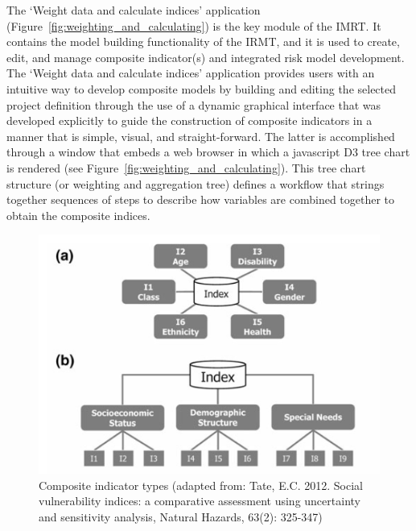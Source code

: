 The `Weight data and calculate indices' application
(Figure~\ref{fig:weighting_and_calculating}) is the key module of the IMRT\@. It
contains the model building functionality of the IRMT, and it is used to
create, edit, and manage composite indicator(s) and integrated risk model
development. The `Weight data and calculate indices' application provides users
with an intuitive way to develop composite models by building and editing the
selected project definition through the use of a dynamic graphical interface
that was developed explicitly to guide the construction of composite indicators
in a manner that is simple, visual, and straight-forward. The latter is
accomplished through a window that embeds a web browser in which a javascript
D3 tree chart is rendered (see Figure~\ref{fig:weighting_and_calculating}).
This tree chart structure (or weighting and aggregation tree) defines a
workflow that strings together sequences of steps to describe how variables are
combined together to obtain the composite indices.  

\begin{figure}
    \centering
    \includegraphics[width=\textwidth]{../images/image19}
    \caption{Composite indicator types (adapted from: Tate, E.C. 2012.
    Social vulnerability indices: a comparative assessment using uncertainty
    and sensitivity analysis, Natural Hazards, 63(2): 325-347)}
    \label{fig:composite_indicator_types}
\end{figure}

